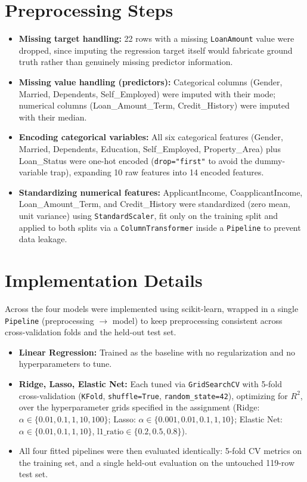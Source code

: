 \documentclass[12pt,a4paper]{article}
\begin{document}
\section{Preprocessing Steps}
\begin{itemize}
\item \textbf{Missing target handling:} 22 rows with a missing \texttt{LoanAmount} value were
dropped, since imputing the regression target itself would fabricate ground truth rather than
genuinely missing predictor information.
\item \textbf{Missing value handling (predictors):} Categorical columns (Gender, Married,
Dependents, Self\_Employed) were imputed with their mode; numerical columns
(Loan\_Amount\_Term, Credit\_History) were imputed with their median.
\item \textbf{Encoding categorical variables:} All six categorical features (Gender, Married,
Dependents, Education, Self\_Employed, Property\_Area) plus Loan\_Status were one-hot encoded
(\texttt{drop="first"} to avoid the dummy-variable trap), expanding 10 raw features into 14
encoded features.
\item \textbf{Standardizing numerical features:} ApplicantIncome, CoapplicantIncome,
Loan\_Amount\_Term, and Credit\_History were standardized (zero mean, unit variance) using
\texttt{StandardScaler}, fit only on the training split and applied to both splits via a
\texttt{ColumnTransformer} inside a \texttt{Pipeline} to prevent data leakage.
\end{itemize}

\section{Implementation Details}
Across the four models were implemented using scikit-learn, wrapped in a single
\texttt{Pipeline} (preprocessing $\rightarrow$ model) to keep preprocessing consistent across
cross-validation folds and the held-out test set.

\begin{itemize}
\item \textbf{Linear Regression:} Trained as the baseline with no regularization and no
hyperparameters to tune.
\item \textbf{Ridge, Lasso, Elastic Net:} Each tuned via \texttt{GridSearchCV} with 5-fold
cross-validation (\texttt{KFold}, \texttt{shuffle=True}, \texttt{random\_state=42}), optimizing
for $R^2$, over the hyperparameter grids specified in the assignment (Ridge:
$\alpha \in \{0.01, 0.1, 1, 10, 100\}$; Lasso: $\alpha \in \{0.001, 0.01, 0.1, 1, 10\}$;
Elastic Net: $\alpha \in \{0.01, 0.1, 1, 10\}$, $\text{l1\_ratio} \in \{0.2, 0.5, 0.8\}$).
\item All four fitted pipelines were then evaluated identically: 5-fold CV metrics on the
training set, and a single held-out evaluation on the untouched 119-row test set.
\end{itemize}
\end{document}

